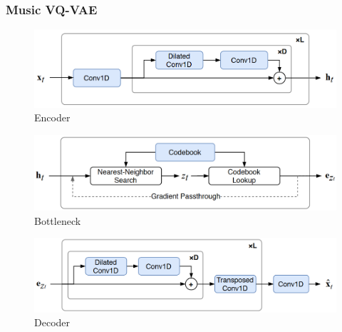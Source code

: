 \documentclass[dvipdfmx]{beamer}
\begin{document}
 \begin{frame}
    \frametitle{Music VQ-VAE}
    \begin{figure}[ht]
        \begin{center}
            \includegraphics[scale=0.200]{figure/encoder.png}
            \vspace{-0.5\baselineskip}
            \caption{Encoder}
        \end{center}
    \end{figure}
    \vspace{-0.5\baselineskip}

    \begin{figure}[ht]
        \begin{center}
            \includegraphics[scale=0.175]{figure/bottleneck.png}
            \vspace{-0.5\baselineskip}
            \caption{Bottleneck}
        \end{center}
    \end{figure}
    \vspace{-0.5\baselineskip}

    \begin{figure}[ht]
        \begin{center}
            \includegraphics[scale=0.195]{figure/decoder.png}
            \vspace{-0.5\baselineskip}
            \caption{Decoder}
        \end{center}
    \end{figure}
\end{frame}
\end{document}

